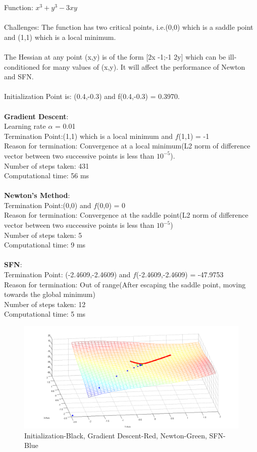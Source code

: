 Function: $x^3 + y^3-3xy$
\\\\Challenges: The function has two critical points, i.e.(0,0) which is a saddle point and (1,1) which is a local minimum.
\\\\The Hessian at any point (x,y) is of the form [2x -1;-1 2y] which can be ill-conditioned for many values of (x,y). It will affect the performance of Newton and SFN.
\\\\
Initialization Point is: (0.4,-0.3) and f(0.4,-0.3) = 0.3970.
\\\\
\textbf{Gradient Descent}: 
\\Learning rate $\alpha$ = 0.01
\\Termination Point:(1,1) which is a local minimum and $f$(1,1) = -1
\\Reason for termination: Convergence at a local minimum(L2 norm of difference vector between two successive points is less than $10^{-5}$).
\\Number of steps taken: 431
\\Computational time: 56 ms
\\\\
\textbf{Newton’s Method}: 
\\Termination Point:(0,0) and $f$(0,0) = 0
\\Reason for termination: Convergence at the saddle point(L2 norm of difference vector between two successive points is less than $10^{-5}$)
\\Number of steps taken: 5
\\Computational time: 9 ms
\\\\
\textbf{SFN}: 
\\Termination Point: (-2.4609,-2.4609) and $f$(-2.4609,-2.4609) = -47.9753
\\Reason for termination: Out of range(After escaping the saddle point, moving towards the global minimum)
\\Number of steps taken: 12
\\Computational time: 5 ms

\begin{figure}[H]
\includegraphics[scale = 0.45]{61.png}
\caption{Initialization-Black, Gradient Descent-Red, Newton-Green, SFN-Blue}
\end{figure}

